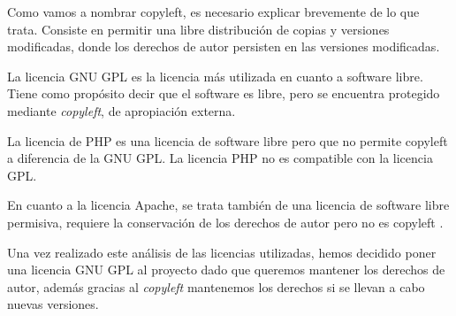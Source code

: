 Como vamos a nombrar copyleft, es necesario explicar brevemente de lo que trata. Consiste en permitir una libre distribución de copias y versiones modificadas, donde los derechos de autor persisten en las versiones modificadas\cite{wiki:copyleft}.

La licencia GNU GPL es la licencia más utilizada en cuanto a software libre. Tiene como propósito decir que el software es libre, pero se encuentra protegido mediante \textit{copyleft}, de apropiación externa\cite{wiki:gnu_gpl}.

La licencia de PHP es una licencia de software libre pero que no permite copyleft a diferencia de la GNU GPL. La licencia PHP no es compatible con la licencia GPL\cite{wiki:licencia_php}.

En cuanto a la licencia Apache, se trata también de una licencia de software libre permisiva, requiere la conservación de los derechos de autor pero no es copyleft \cite{wiki:licencia_apache}.

Una vez realizado este análisis de las licencias utilizadas, hemos decidido poner una licencia GNU GPL al  proyecto dado que queremos mantener los derechos de autor, además gracias al \textit{copyleft} mantenemos los derechos si se llevan a cabo nuevas versiones.

